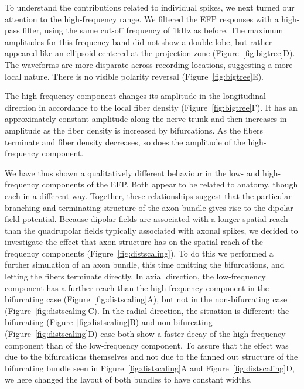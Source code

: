 \documentclass[]{article}
\begin{document}
To understand the contributions related to individual spikes, we next
turned our attention to the high-frequency range. We filtered the EFP
responses with a high-pass filter, using the same cut-off frequency of
1kHz as before. The maximum amplitudes for this frequency band did not
show a double-lobe, but rather appeared like an ellipsoid centered at
the projection zone (Figure~\ref{fig:bigtree}D). The waveforms are more
disparate across recording locations, suggesting a more local nature.
There is no visible polarity reversal (Figure~\ref{fig:bigtree}E).

The high-frequency component changes its amplitude in the longitudinal
direction in accordance to the local fiber density
(Figure~\ref{fig:bigtree}F). It has an approximately constant amplitude
along the nerve trunk and then increases in amplitude as the fiber
density is increased by bifurcations. As the fibers terminate and fiber
density decreases, so does the amplitude of the high-frequency
component.

We have thus shown a qualitatively different behaviour in the low- and
high-frequency components of the EFP. Both appear to be related to
anatomy, though each in a different way. Together, these relationships
suggest that the particular branching and terminating structure of the
axon bundle gives rise to the dipolar field potential. Because dipolar
fields are associated with a longer spatial reach than the quadrupolar
fields typically associated with axonal spikes, we decided to
investigate the effect that axon structure has on the spatial reach of
the frequency components (Figure~\ref{fig:distscaling}). To do this we
performed a further simulation of an axon bundle, this time omitting the
bifurcations, and letting the fibers terminate directly. In axial
direction, the low-frequency component has a further reach than the high
frequency component in the bifurcating case
(Figure~\ref{fig:distscaling}A), but not in the non-bifurcating case
(Figure~\ref{fig:distscaling}C). In the radial direction, the situation
is different: the bifurcating (Figure~\ref{fig:distscaling}B) and
non-bifurcating (Figure~\ref{fig:distscaling}D) case both show a faster
decay of the high-frequency component than of the low-frequency
component. To assure that the effect was due to the bifurcations
themselves and not due to the fanned out structure of the bifurcating
bundle seen in Figure~\ref{fig:distscaling}A and
Figure~\ref{fig:distscaling}D, we here changed the layout of both
bundles to have constant widths.
\end{document}

